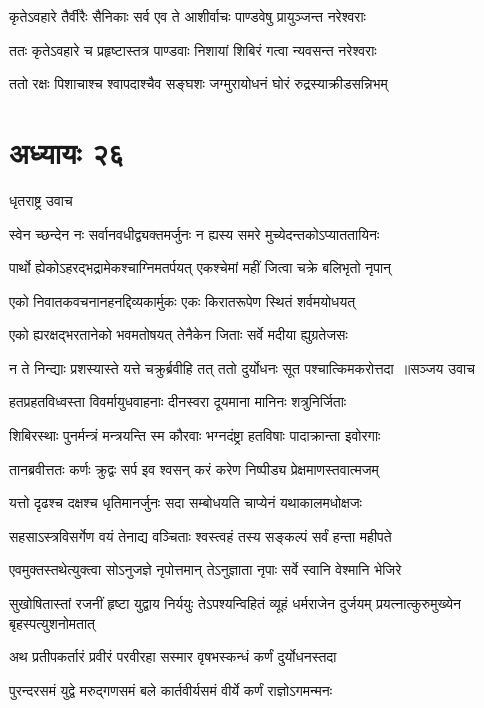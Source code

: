 \twolineshloka
{कृतेऽवहारे तैर्वीरैः सैनिकाः सर्व एव ते}
{आशीर्वाचः पाण्डवेषु प्रायुञ्जन्त नरेश्वराः}


\twolineshloka
{ततः कृतेऽवहारे च प्रहृष्टास्तत्र पाण्डवाः}
{निशायां शिबिरं गत्वा न्यवसन्त नरेश्वराः}


\twolineshloka
{ततो रक्षः पिशाचाश्च श्वापदाश्चैव सङ्घशः}
{जग्मुरायोधनं घोरं रुद्रस्याक्रीडसन्निभम्}


\chapter{अध्यायः २६}
\twolineshloka
{धृतराष्ट्र उवाच}
{}


\twolineshloka
{स्वेन च्छन्देन नः सर्वानवधीद्व्यक्तमर्जुनः}
{न ह्यस्य समरे मुच्येदन्तकोऽप्याततायिनः}


\twolineshloka
{पार्थो ह्येकोऽहरद्भद्रामेकश्चाग्निमतर्पयत्}
{एकश्चेमां महीं जित्वा चक्रे बलिभृतो नृपान्}


\twolineshloka
{एको निवातकवचनानहनद्दिव्यकार्मुकः}
{एकः किरातरूपेण स्थितं शर्वमयोधयत्}


\twolineshloka
{एको ह्यरक्षद्भरतानेको भवमतोषयत्}
{तेनैकेन जिताः सर्वे मदीया ह्युग्रतेजसः}


\threelineshloka
{न ते निन्द्याः प्रशस्यास्ते यत्ते चक्रुर्ब्रवीहि तत्}
{ततो दुर्योधनः सूत पश्चात्किमकरोत्तदा ॥सञ्जय उवाच}
{}


\twolineshloka
{हतप्रहतविध्वस्ता विवर्मायुधवाहनाः}
{दीनस्वरा दूयमाना मानिनः शत्रुनिर्जिताः}


\twolineshloka
{शिबिरस्थाः पुनर्मन्त्रं मन्त्रयन्ति स्म कौरवाः}
{भग्नदंष्ट्रा हतविषाः पादाक्रान्ता इवोरगाः}


\twolineshloka
{तानब्रवीत्ततः कर्णः क्रुद्वः सर्प इव श्वसन्}
{करं करेण निष्पीड्य प्रेक्षमाणस्तवात्मजम्}


\twolineshloka
{यत्तो दृढश्च दक्षश्च धृतिमानर्जुनः सदा}
{सम्बोधयति चाप्येनं यथाकालमधोक्षजः}


\twolineshloka
{सहसाऽस्त्रविसर्गेण वयं तेनाद्य वञ्चिताः}
{श्वस्त्वहं तस्य सङ्कल्पं सर्वं हन्ता महीपते}


\twolineshloka
{एवमुक्तस्तथेत्युक्त्वा सोऽनुजज्ञे नृपोत्तमान्}
{तेऽनुज्ञाता नृपाः सर्वे स्वानि वेश्मानि भेजिरे}


\threelineshloka
{सुखोषितास्तां रजनीं हृष्टा युद्वाय निर्ययुः}
{तेऽपश्यन्विहितं व्यूहं धर्मराजेन दुर्जयम्}
{प्रयत्नात्कुरुमुख्येन बृहस्पत्युशनोमतात्}


\twolineshloka
{अथ प्रतीपकर्तारं प्रवीरं परवीरहा}
{सस्मार वृषभस्कन्धं कर्णं दुर्योधनस्तदा}


\twolineshloka
{पुरन्दरसमं युद्वे मरुद्गणसमं बले}
{कार्तवीर्यसमं वीर्ये कर्णं राज्ञोऽगमन्मनः}


